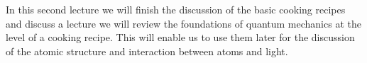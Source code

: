 In this second lecture we will finish the discussion of the basic cooking recipes and discuss a  lecture we will review the foundations of quantum mechanics at the level of a cooking recipe. This will enable us to use them later for the discussion of the atomic structure and interaction between atoms and light.